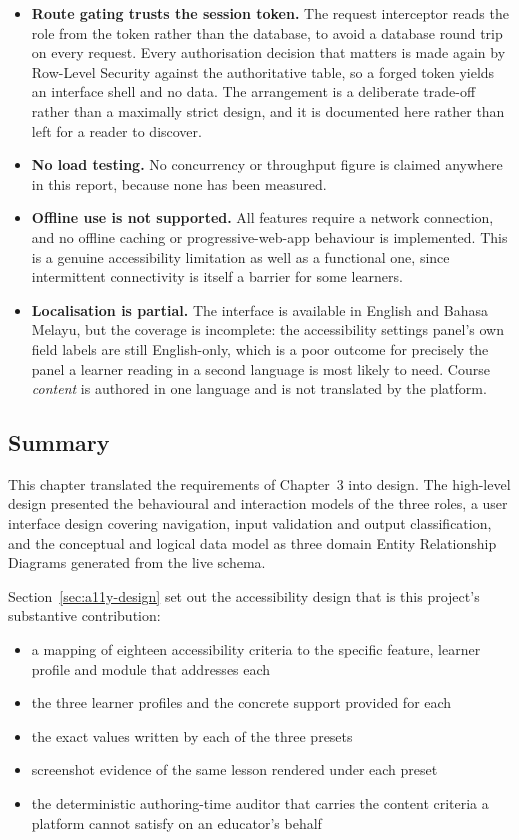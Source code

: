 \documentclass[12pt, oneside]{article} %
\begin{document}
\begin{itemize}
    \item \textbf{Route gating trusts the session token.} The request interceptor reads the role from the token rather than the database, to avoid a database round trip on every request. Every authorisation decision that matters is made again by Row-Level Security against the authoritative table, so a forged token yields an interface shell and no data. The arrangement is a deliberate trade-off rather than a maximally strict design, and it is documented here rather than left for a reader to discover.

    \item \textbf{No load testing.} No concurrency or throughput figure is claimed anywhere in this report, because none has been measured.

    \item \textbf{Offline use is not supported.} All features require a network connection, and no offline caching or progressive-web-app behaviour is implemented. This is a genuine accessibility limitation as well as a functional one, since intermittent connectivity is itself a barrier for some learners.

    \item \textbf{Localisation is partial.} The interface is available in English and Bahasa Melayu, but the coverage is incomplete: the accessibility settings panel's own field labels are still English-only, which is a poor outcome for precisely the panel a learner reading in a second language is most likely to need. Course \emph{content} is authored in one language and is not translated by the platform.
\end{itemize}

\subsection{Summary}

This chapter translated the requirements of Chapter~3 into design. The high-level design presented the behavioural and interaction models of the three roles, a user interface design covering navigation, input validation and output classification, and the conceptual and logical data model as three domain Entity Relationship Diagrams generated from the live schema.

Section~\ref{sec:a11y-design} set out the accessibility design that is this project's substantive contribution:

\begin{itemize}
    \item a mapping of eighteen accessibility criteria to the specific feature, learner profile and module that addresses each
    \item the three learner profiles and the concrete support provided for each
    \item the exact values written by each of the three presets
    \item screenshot evidence of the same lesson rendered under each preset
    \item the deterministic authoring-time auditor that carries the content criteria a platform cannot satisfy on an educator's behalf
\end{itemize}
\end{document}

